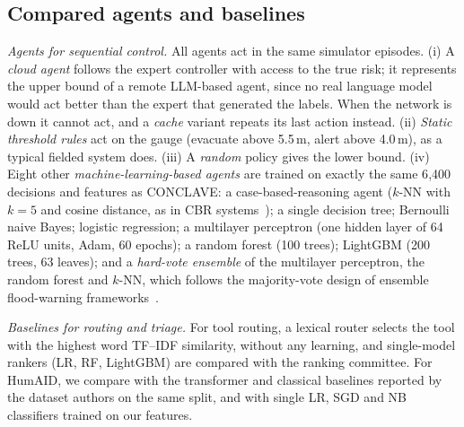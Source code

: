 \documentclass[journal]{IEEEtran}
\begin{document}
\subsection{Compared agents and baselines}\label{sec:baselines}
\textit{Agents for sequential control.} All agents act in the same simulator
episodes. (i) A \emph{cloud agent} follows the expert controller with access to
the true risk; it represents the upper bound of a remote LLM-based agent, since
no real language model would act better than the expert that generated the
labels. When the network is down it cannot act, and a \emph{cache} variant
repeats its last action instead. (ii) \emph{Static threshold rules} act on the
gauge (evacuate above 5.5\,m, alert above 4.0\,m), as a typical fielded system
does. (iii) A \emph{random} policy gives the lower bound. (iv) Eight other
\emph{machine-learning-based agents} are trained on exactly the same 6{,}400
decisions and features as CONCLAVE: a case-based-reasoning agent ($k$-NN with
$k=5$ and cosine distance, as in CBR systems~\cite{rashid2024integrating}); a
single decision tree; Bernoulli naive Bayes; logistic regression; a multilayer
perceptron (one hidden layer of 64 ReLU units, Adam, 60 epochs); a random forest
(100 trees); LightGBM (200 trees, 63 leaves); and a \emph{hard-vote ensemble}
of the multilayer perceptron, the random forest and $k$-NN, which follows the
majority-vote design of ensemble flood-warning
frameworks~\cite{sen2026context}.

\textit{Baselines for routing and triage.} For tool routing, a lexical router
selects the tool with the highest word TF--IDF similarity, without any
learning, and single-model rankers (LR, RF, LightGBM) are compared with the
ranking committee. For HumAID, we compare with the transformer and classical
baselines reported by the dataset authors on the same split, and with single
LR, SGD and NB classifiers trained on our features.
\end{document}
